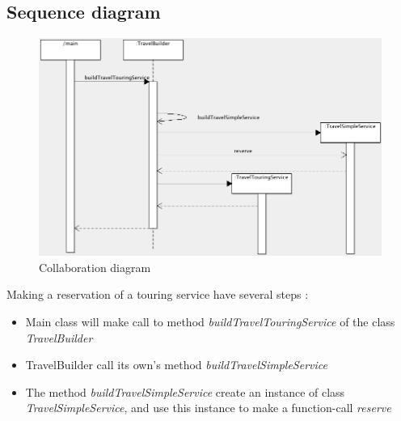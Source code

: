\subsection{Sequence diagram}

\begin{figure}[h]
\centering
\includegraphics[width=12cm]{project/images/sequence.png}
\caption{Collaboration diagram}
\end{figure}

Making a reservation of a touring service have several steps :
\begin{itemize}
\item Main class will make call to method \textit{buildTravelTouringService} of the class \textit{TravelBuilder}
\item TravelBuilder call its own's method \textit{buildTravelSimpleService} 
\item The method \textit{buildTravelSimpleService} create an instance of class \textit{TravelSimpleService}, and use this instance to make a function-call \textit{reserve}
\end{itemize}
